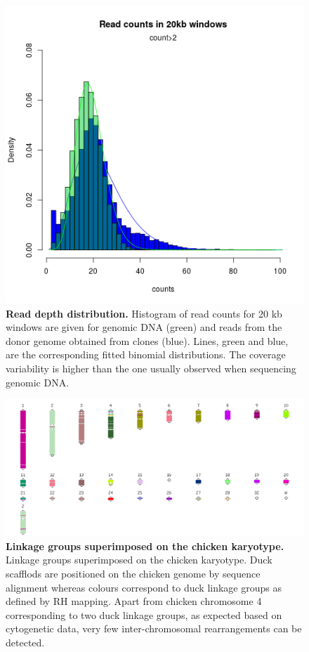\documentclass[10pt,letterpaper]{article}
\DeclareRobustCommand{\csentence}[1]{
    {\mathversion{bold}\bfseries #1}}
\begin{document}
\begin{figure}[h!]
 \begin{center}
  \includegraphics[scale=0.6]{S2_ReadCounts}
  \end{center}
  \caption{\csentence{Read depth distribution.}
    Histogram of read counts for 20 kb windows are given for genomic DNA (green) and reads from the donor genome obtained from clones (blue). Lines, green and blue, are the corresponding fitted binomial distributions. The coverage variability is higher than the one usually observed when sequencing genomic DNA. }
\label{suppfig2}
\end{figure}

\begin{figure}[h!]
  \includegraphics[scale=0.4]{S3_DuckScaffoldsKaryotype}
  \caption{\csentence{Linkage groups superimposed on the chicken karyotype.}
    Linkage groups superimposed on the chicken karyotype. Duck scafflods are positioned on the chicken genome by sequence alignment whereas colours correspond to duck linkage groups as defined by RH mapping. Apart from chicken chromosome 4 corresponding to two duck linkage groups, as expected based on cytogenetic data, very few inter-chromosomal rearrangements can be detected.}
\label{suppfig3}
\end{figure}
\end{document}

